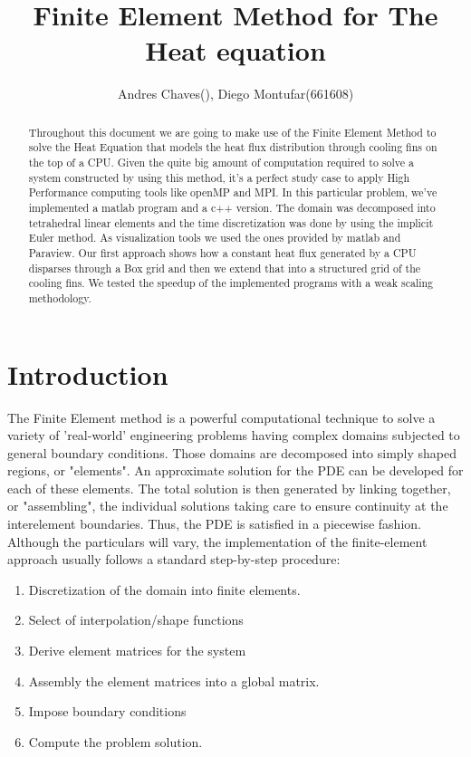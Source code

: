 \documentclass[12pt]{article}
\begin{document}
	
	
	\title{Finite Element Method for The Heat equation}
	\author{Andres Chaves(), Diego Montufar(661608)}
	
	\maketitle
	
	\begin{abstract}
		Throughout this document we are going to make use of the Finite Element Method to solve the Heat Equation that models the heat flux distribution through cooling fins on the top of a CPU.  Given the quite big amount of computation required to solve a system constructed by using this method, it's a perfect study case to apply High Performance computing tools like openMP and MPI. In this particular problem, we've implemented a matlab program and a c++ version. The domain was decomposed into tetrahedral linear elements and the time discretization was done by using the implicit Euler method. As visualization tools we used the ones provided by matlab and Paraview. Our first approach shows how a constant heat flux generated by a CPU disparses through a Box grid and then we extend that into a structured grid of the cooling fins. We tested the speedup of the implemented programs with a weak scaling methodology.
	\end{abstract}
	
	\section{Introduction}
	The Finite Element method is a powerful computational technique to solve a variety of 'real-world' engineering problems having complex domains subjected to general boundary conditions. Those domains are decomposed into simply shaped regions, or "elements". An approximate solution for the PDE can be developed for each of these elements. The total solution is then generated by linking together, or "assembling", the individual solutions taking care to ensure continuity at the interelement boundaries. Thus, the PDE is satisfied in a piecewise fashion.\\
	
Although the particulars will vary, the implementation of the finite-element approach usually follows a standard step-by-step procedure:\\

\begin{enumerate}
  \item Discretization of the domain into finite elements.
  \item Select of interpolation/shape functions
  \item Derive element matrices for the system
  \item Assembly the element matrices into a global matrix.
  \item Impose boundary conditions
  \item Compute the problem solution.
\end{enumerate}
\end{document}
